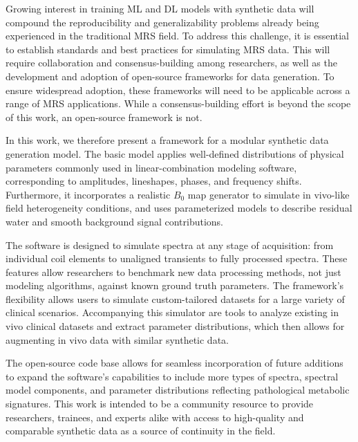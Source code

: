 Growing interest in training ML and DL models with synthetic data will compound the reproducibility and generalizability problems already being experienced in the traditional MRS field. To address this challenge, it is essential to establish standards and best practices for simulating MRS data. This will require collaboration and consensus-building among researchers, as well as the development and adoption of open-source frameworks for data generation. To ensure widespread adoption, these frameworks will need to be applicable across a range of MRS applications. While a consensus-building effort is beyond the scope of this work, an open-source framework is not.
 
 
In this work, we therefore present a framework for a modular synthetic data generation model. The basic model applies well-defined distributions of physical parameters commonly used in linear-combination modeling software, corresponding to amplitudes, lineshapes, phases, and frequency shifts. Furthermore, it incorporates a realistic $B_0$ map generator to simulate in vivo-like field heterogeneity conditions, and uses parameterized models to describe residual water and smooth background signal contributions.
 
The software is designed to simulate spectra at any stage of acquisition: from individual coil elements to unaligned transients to fully processed spectra. These features allow researchers to benchmark new data processing methods, not just modeling algorithms, against known ground truth parameters. The framework's flexibility allows users to simulate custom-tailored datasets for a large variety of clinical scenarios. Accompanying this simulator are tools to analyze existing in vivo clinical datasets and extract parameter distributions, which then allows for augmenting in vivo data with similar synthetic data.
 
The open-source code base allows for seamless incorporation of future additions to expand the software's capabilities to include more types of spectra, spectral model components, and parameter distributions reflecting pathological metabolic signatures. This work is intended to be a community resource to provide researchers, trainees, and experts alike with access to high-quality and comparable synthetic data as a source of continuity in the field.

